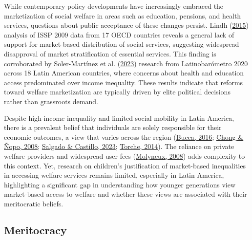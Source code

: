 \documentclass[
  letterpaper,
  DIV=11,
  numbers=noendperiod]{scrartcl}
\begin{document}
While contemporary policy developments have increasingly embraced the
marketization of social welfare in areas such as education, pensions,
and health services, questions about public acceptance of these changes
persist. Lindh (\protect\hyperlink{ref-lindh_public_2015}{2015})
analysis of ISSP 2009 data from 17 OECD countries reveals a general lack
of support for market-based distribution of social services, suggesting
widespread disapproval of market stratification of essential services.
This finding is corroborated by Soler-Martínez et al.
(\protect\hyperlink{ref-soler-martinez_concerns_2023}{2023}) research
from Latinobarómetro 2020 across 18 Latin American countries, where
concerns about health and education access predominated over income
inequality. These results indicate that reforms toward welfare
marketization are typically driven by elite political decisions rather
than grassroots demand.

Despite high-income inequality and limited social mobility in Latin
America, there is a prevalent belief that individuals are solely
responsible for their economic outcomes, a view that varies across the
region (\protect\hyperlink{ref-bucca_merit_2016}{Bucca, 2016};
\protect\hyperlink{ref-chong_mystery_2008}{Chong \& Ñopo, 2008};
\protect\hyperlink{ref-salgado_inequality_2023}{Salgado \& Castillo,
2023}; \protect\hyperlink{ref-torche_intergenerational_2014}{Torche,
2014}). The reliance on private welfare providers and widespread user
fees (\protect\hyperlink{ref-molyneux_neoliberal_2008}{Molyneux, 2008})
adds complexity to this context. Yet, research on children's
justification of market-based inequalities in accessing welfare services
remains limited, especially in Latin America, highlighting a significant
gap in understanding how younger generations view market-based access to
welfare and whether these views are associated with their meritocratic
beliefs.

\hypertarget{meritocracy}{%
\subsection{Meritocracy}\label{meritocracy}}
\end{document}
